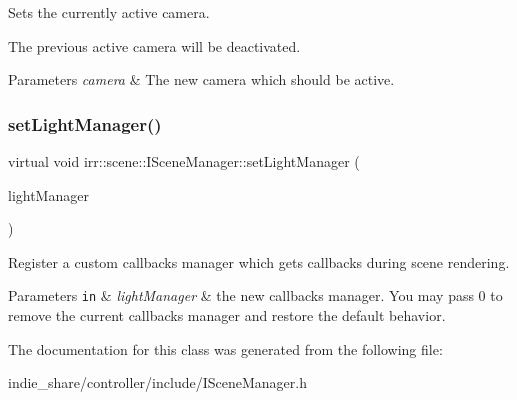 Sets the currently active camera. 

The previous active camera will be deactivated. 
\begin{DoxyParams}{Parameters}
{\em camera} & The new camera which should be active. \\
\hline
\end{DoxyParams}
\mbox{\label{classirr_1_1scene_1_1ISceneManager_a0065307bf3ff12fdc5b7bb624987a1c2}} 
\subsubsection{\texorpdfstring{set\+Light\+Manager()}{setLightManager()}}
{\footnotesize\ttfamily virtual void irr\+::scene\+::\+I\+Scene\+Manager\+::set\+Light\+Manager (\begin{DoxyParamCaption}\item[{\hyperlink{classirr_1_1scene_1_1ILightManager}{I\+Light\+Manager} $\ast$}]{light\+Manager }\end{DoxyParamCaption})\hspace{0.3cm}{\ttfamily [pure virtual]}}



Register a custom callbacks manager which gets callbacks during scene rendering. 


\begin{DoxyParams}[1]{Parameters}
\mbox{\tt in}  & {\em light\+Manager} & the new callbacks manager. You may pass 0 to remove the current callbacks manager and restore the default behavior. \\
\hline
\end{DoxyParams}


The documentation for this class was generated from the following file\+:\begin{DoxyCompactItemize}
\item 
indie\+\_\+share/controller/include/I\+Scene\+Manager.\+h\end{DoxyCompactItemize}
